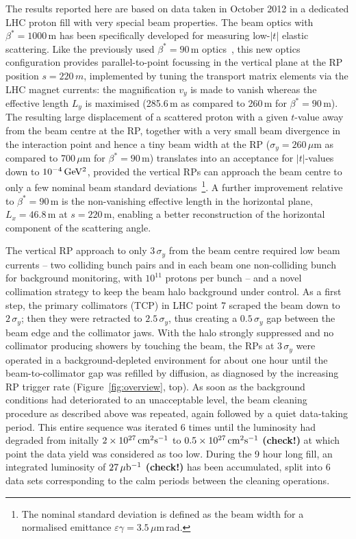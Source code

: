 \documentclass[TOTEM]{cern/cernphprep}
\begin{document}
The results reported here are based on data taken in October 2012 
in a dedicated LHC proton fill
with very special beam properties. The beam optics with $\beta^{*} = 1000\,$m
has been specifically developed for measuring low-$|t|$ elastic scattering.
Like the previously used $\beta^{*} = 90\,$m optics~\cite{epl96,epl101,prl111},
this new optics configuration
provides parallel-to-point focussing in the vertical plane at the RP position 
$s = 220\,m$, implemented by tuning the transport matrix elements via the
LHC magnet currents: the magnification $v_{y}$ is made to vanish whereas the 
effective length $L_{y}$ is maximised (285.6\,m as compared to 260\,m for 
$\beta^{*} = 90\,$m).
The resulting large displacement of a scattered proton with a given $t$-value 
away from the beam centre at the RP, together with a very small beam 
divergence in the interaction point and hence a tiny beam width 
at the RP ($\sigma_{y} = 260\,\mu$m as compared to 700\,$\mu$m for 
$\beta^{*} = 90\,$m) translates into 
an acceptance for $|t|$-values down to $10^{-4}\,\rm GeV^{2}$, provided the 
vertical RPs can approach the beam centre to only a few nominal beam standard 
deviations~\footnote{The nominal standard deviation is defined as 
the beam width for a normalised emittance 
$\varepsilon \gamma = 3.5\,\mu$m\,rad.}.
A further improvement relative to $\beta^{*} = 90\,$m is the non-vanishing 
effective length in the horizontal plane, $L_{x} = 46.8\,$m at $s = 220\,$m, 
enabling a better reconstruction of the horizontal component of the 
scattering angle.

The vertical RP approach to only $3\,\sigma_{y}$ from the beam centre required
low beam currents -- two colliding bunch pairs and in each beam one 
non-colliding bunch for background monitoring, with $10^{11}$ protons per bunch 
-- and a novel collimation strategy 
to keep the beam halo background under control. As a first step, the primary 
collimators (TCP) in LHC point 7 scraped the beam down to $2\,\sigma_{y}$; then 
they were retracted to $2.5\,\sigma_{y}$, thus creating a $0.5\,\sigma_{y}$ gap 
between
the beam edge and the collimator jaws. With the halo strongly suppressed 
and no collimator producing showers by touching the beam, the RPs at 
$3\,\sigma_{y}$ were operated in a background-depleted environment for about one 
hour until the beam-to-collimator gap was refilled by diffusion, as 
diagnosed by the increasing RP trigger rate (Figure~\ref{fig:overview}, top). As soon as the background conditions
had deteriorated to an unacceptable level, the beam cleaning procedure as described above was repeated, again followed by a quiet data-taking period.
This entire sequence was iterated 6 times until the luminosity had degraded 
from initally $2\times10^{27}\,\rm cm^{2}s^{-1}$ to 
$0.5\times10^{27}\,\rm cm^{2}s^{-1}$ \textbf{(check!)} at which point the data yield was considered as too low. 
During the 9 hour long fill, an integrated luminosity of $27\,\rm \mu b^{-1}$ 
\textbf{(check!)} has been 
accumulated, split into 6 data sets corresponding to the calm periods between
the cleaning operations. 
\end{document}
